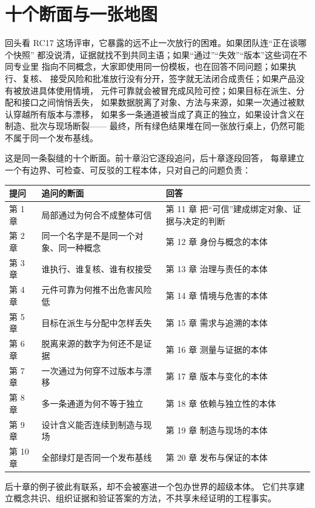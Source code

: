 \section{十个断面与一张地图}

回头看 RC17 这场评审，它暴露的远不止一次放行的困难。如果团队连“正在谈哪个快照”
都没说清，证据就找不到共同主语；如果“通过”“失效”“版本”这些词在不同专业里
指向不同概念，大家即使用同一份模板，也在回答不同问题；如果执行、复核、
接受风险和批准放行没有分开，签字就无法闭合成责任；如果产品没有被放进具体使用情境，
元件可靠就会被冒充成风险可控；如果目标在派生、分配和接口之间悄悄丢失，
如果数据脱离了对象、方法与来源，如果一次通过被默认穿越所有版本与漂移，
如果多一条通道被当成了真正的独立，如果设计含义在制造、批次与现场断裂——
最终，所有绿色结果堆在同一张放行桌上，仍然可能不属于同一个发布基线。

这是同一条裂缝的十个断面。前十章沿它逐段追问，后十章逐段回答，
每章建立一个有边界、可检查、可反驳的工程本体，只对自己的问题负责：

\begingroup\small
\setlength{\tabcolsep}{4pt}
\begin{xltabular}{\linewidth}{@{}XXX@{}}
\toprule
提问 & 追问的断面 & 回答 \\
\midrule
\endhead
第 1 章 & 局部通过为何合不成整体可信 & 第 11 章 把“可信”建成绑定对象、证据与决定的判断 \\
第 2 章 & 同一个名字是不是同一个对象、同一种概念 & 第 12 章 身份与概念的本体 \\
第 3 章 & 谁执行、谁复核、谁有权接受 & 第 13 章 治理与责任的本体 \\
第 4 章 & 元件可靠为何推不出危害风险低 & 第 14 章 情境与危害的本体 \\
第 5 章 & 目标在派生与分配中怎样丢失 & 第 15 章 需求与追溯的本体 \\
第 6 章 & 脱离来源的数字为何还不是证据 & 第 16 章 测量与证据的本体 \\
第 7 章 & 一次通过为何穿不过版本与漂移 & 第 17 章 版本与变化的本体 \\
第 8 章 & 多一条通道为何不等于独立 & 第 18 章 依赖与独立性的本体 \\
第 9 章 & 设计含义能否连续到制造与现场 & 第 19 章 制造与现场的本体 \\
第 10 章 & 全部绿灯是否同一个发布基线 & 第 20 章 发布与保证的本体 \\
\bottomrule
\end{xltabular}
\endgroup

后十章的例子彼此有联系，却不会被塞进一个包办世界的超级本体。
它们共享建立概念共识、组织证据和验证答案的方法，不共享未经证明的工程事实。

